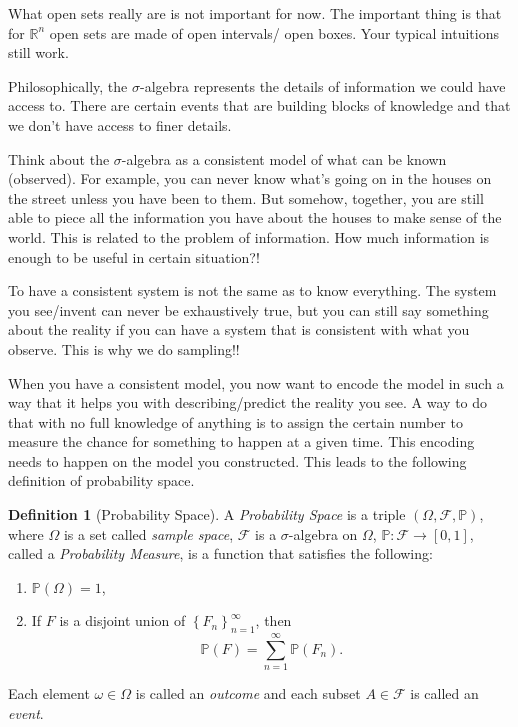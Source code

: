 \documentclass[
  openany]{book}
\theoremstyle{definition}
\newtheorem{definition}{Definition}[chapter]
\theoremstyle{definition}
\theoremstyle{definition}
\theoremstyle{definition}
\theoremstyle{remark}
\begin{document}
What open sets really are is not important for now. The important thing is that for \(\mathbb{R}^n\)
open sets are made of open intervals/ open boxes.
Your typical intuitions still work.

Philosophically, the \(\sigma\)-algebra represents the details of information we could have access to.
There are certain events that are building blocks of knowledge and that we don't have
access to finer details.

Think about the \(\sigma\)-algebra as a consistent model of what can be known (observed). For example, you can never know
what's going on in the houses on the street unless you have been to them.
But somehow, together, you are still able to piece all the information you have about the houses
to make sense of the world. This is related to the problem of information. How much information is enough to be useful in certain situation?!

To have a consistent system is not the same as to know everything. The system
you see/invent can never be exhaustively true, but you can still say something about
the reality if you can have a system that is consistent with what you observe. This
is why we do sampling!!

When you have a consistent model, you now want to encode the model in such a way
that it helps you with describing/predict the reality you see.
A way to do that with no full knowledge of anything is to assign the certain number
to measure the chance for something to happen at a given time.
This encoding needs to happen on the model you constructed. This leads to the following definition of
probability space.

\begin{definition}[Probability Space]
A \emph{Probability Space} is a triple \((\Omega, \mathcal{F}, \mathbb{P})\), where
\(\Omega\) is a set called \emph{sample space}, \(\mathcal{F}\) is a \(\sigma\)-algebra on \(\Omega\),
\(\mathbb{P}: \mathcal{F}\to [0,1]\), called a \emph{Probability Measure}, is a function that satisfies the following:

\begin{enumerate}
\def\labelenumi{\arabic{enumi}.}
\item
  \(\mathbb{P}(\Omega) =1\),
\item
  If \(F\) is a disjoint union of \(\left\{ F_n  \right\}_{n=1}^\infty\), then
  \[ \mathbb{P}(F) = \sum_{n=1}^\infty \mathbb{P}(F_n) . \]
\end{enumerate}

Each element \(\omega \in \Omega\) is called an \emph{outcome} and each subset \(A \in \mathcal{F}\)
is called an \emph{event}.
\end{definition}
\end{document}
